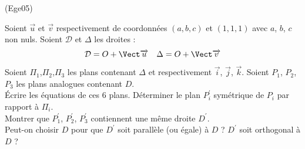 \begin{tiny}(Ege05)\end{tiny}
Soient $\overrightarrow{u}$ et $\overrightarrow{v}$ respectivement de coordonn{\'e}es $(a,b,c)$ et $(1,1,1)$ avec $a$, $b$, $c$ non nuls. Soient $\mathcal D$ et $\Delta$ les droites :
\begin{align*}
\mathcal{D}=O + \Vect\overrightarrow{u} & &
\Delta = O + \Vect\overrightarrow{v} 
\end{align*}
Soient $\Pi _{1}$,$\Pi _{2}$,$\Pi _{3}$ les plans contenant $\Delta $ et respectivement $\overrightarrow{i}$,
$\overrightarrow{j}$, $\overrightarrow{k}$. Soient $P_{1}$, $P_{2}$, $P_{3}$ les plans analogues contenant $D$.\\ \'Ecrire les {\'e}quations de ces 6 plans. D{\'e}terminer le plan $P_{i}^{\prime }$ sym{\'e}trique de $P_{i}$ par
rapport {\`a} $\Pi _{i}$.\\
Montrer que $P_{1}^{\prime }$, $P_{2}^{\prime }$, $P_{3}^{\prime }$ contiennent une m{\^e}me droite $D^{\prime }$.\\
Peut-on choisir $D$ pour que $D^{\prime }$ soit parall{\`e}le (ou égale) {\`a} $D$ ? $D^{\prime }$ soit orthogonal {\`a} $D$ ?

